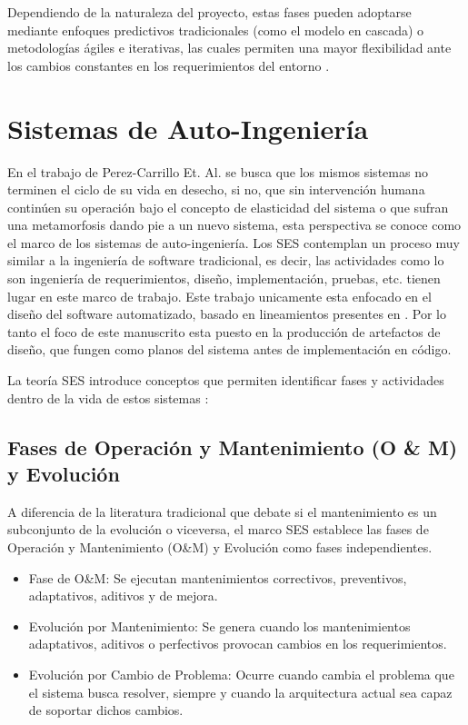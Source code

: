 \documentclass[12pt, letterpaper, oneside]{book}
\begin{document}
Dependiendo de la naturaleza del proyecto, estas fases pueden adoptarse mediante enfoques predictivos tradicionales (como el modelo en cascada) o metodologías ágiles e iterativas, las cuales permiten una mayor flexibilidad ante los cambios constantes en los requerimientos del entorno \cite{12207IEEE,15288LifeCycle,swebok2024}.


\section{Sistemas de Auto-Ingeniería}
En el trabajo de Perez-Carrillo Et. Al. \cite{perez2024} se busca que los mismos sistemas no terminen el ciclo de su vida en desecho, si no, que sin intervención humana continúen su operación bajo el concepto de elasticidad del sistema o que sufran una metamorfosis dando pie a un nuevo sistema, esta perspectiva se conoce como el marco de los sistemas de auto-ingeniería.
Los SES contemplan un proceso muy similar a la ingeniería de software tradicional, es decir, las actividades como lo son ingeniería de requerimientos, diseño, implementación, pruebas, etc.\cite{sommerville2011software} tienen lugar en este marco de trabajo. Este trabajo unicamente esta enfocado en el diseño del software automatizado, basado en lineamientos presentes en \cite{swebok2024}. Por lo tanto el foco de este manuscrito esta puesto en la producción de artefactos de diseño, que fungen como planos del sistema antes de implementación en código.

La teoría SES introduce conceptos que permiten identificar fases y actividades dentro de la vida de estos sistemas \cite{PerezCarrillo2026}:

\subsection{Fases de Operación y Mantenimiento (O \& M) y Evolución}
A diferencia de la literatura tradicional que debate si el mantenimiento es un subconjunto de la evolución o viceversa, el marco SES \cite{PerezCarrillo2026} establece las fases de Operación y Mantenimiento (O\&M) y Evolución como fases independientes.
\begin{itemize}
	\item Fase de O\&M: Se ejecutan mantenimientos correctivos, preventivos, adaptativos, aditivos y de mejora.
	
	\item 	Evolución por Mantenimiento: Se genera cuando los mantenimientos adaptativos, aditivos o perfectivos provocan cambios en los requerimientos.
	\item Evolución por Cambio de Problema: Ocurre cuando cambia el problema que el sistema busca resolver, siempre y cuando la arquitectura actual sea capaz de soportar dichos cambios.
\end{itemize}
\end{document}
